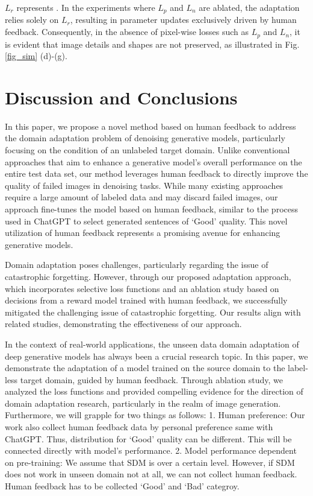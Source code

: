 \documentclass[lettersize,journal]{IEEEtran}
\begin{document}
 $L_r$ represents .
In the experiments where $L_p$ and $L_n$ are ablated, the adaptation relies solely on $L_r$, resulting in parameter updates exclusively driven by human feedback. Consequently, in the absence of pixel-wise losses such as $L_p$ and $L_n$, it is evident that image details and shapes are not preserved, as illustrated in Fig. \ref{fig_sim} (d)-(g).

\section{Discussion and Conclusions}
In this paper, we propose a novel method based on human feedback to address the domain adaptation problem of denoising generative models, particularly focusing on the condition of an unlabeled target domain. Unlike conventional approaches that aim to enhance a generative model's overall performance on the entire test data set, our method leverages human feedback to directly improve the quality of failed images in denoising tasks. While many existing approaches require a large amount of labeled data and may discard failed images, our approach fine-tunes the model based on human feedback, similar to the process used in ChatGPT\cite{brown2020language} to select generated sentences of `Good' quality. This novel utilization of human feedback represents a promising avenue for enhancing generative models. 

Domain adaptation poses challenges, particularly regarding the issue of catastrophic forgetting. However, through our proposed adaptation approach, which incorporates selective loss functions and an ablation study based on decisions from a reward model trained with human feedback, we successfully mitigated the challenging issue of catastrophic forgetting. Our results align with related studies, demonstrating the effectiveness of our approach.

In the context of real-world applications, the unseen data domain adaptation of deep generative models has always been a crucial research topic. In this paper, we demonstrate the adaptation of a model trained on the source domain to the label-less target domain, guided by human feedback. Through ablation study, we analyzed the loss functions and provided compelling evidence for the direction of domain adaptation research, particularly in the realm of image generation. Furthermore, we will grapple for two things as follows:
1. Human preference: Our work also collect human feedback data by personal preference same with ChatGPT. Thus, distribution for `Good' quality can be different. This will be connected directly with model's performance.
2. Model performance dependent on pre-training: We assume that SDM is over a certain level. However, if SDM does not work in unseen domain not at all, we can not collect human feedback. Human feedback has to be collected `Good' and `Bad' categroy.
\end{document}
